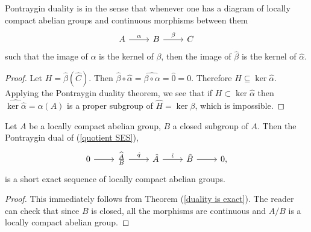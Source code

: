 \begin{theorem}\label{duality is exact}
Pontraygin duality is  in the sense that whenever one has a diagram of locally compact abelian groups and continuous morphisms between them
\[\begin{tikzcd}
A \arrow[r,"\alpha"] & B \arrow[r, "\beta"] & C
\end{tikzcd}
\]
such that the image of $\alpha$ is the kernel of $\beta$, then the image of $\hat{\beta}$ is the kernel of $\hat{\alpha}$.
\end{theorem}
\begin{proof}
Let $H = \hat{\beta}(\hat{C})$. Then $\hat{\beta} \circ \hat{\alpha} = \widehat{\beta \circ \alpha} = \hat 0 = 0$. Therefore $H \subseteq \ker \hat{\alpha}$.
Applying the Pontraygin duality theorem, we see that if $H \subset \ker \hat{\alpha}$ then $\widehat{\ker \hat{\alpha}} = \alpha(A)$ is a proper subgroup of $\hat{H} = \ker \beta$, which is impossible.
\end{proof}

\begin{corollary}\label{duality is exact 2}
Let $A$ be a locally compact abelian group, $B$ a closed subgroup of $A$.
Then the Pontraygin dual of (\ref{quotient SES}),
\[
\begin{tikzcd}
0 \arrow[r] & \widehat{\frac{A}{B}} \arrow[r,"\hat{q}"] & \hat{A} \arrow[r,"\hat{\iota}"] & \hat{B} \arrow[r] & 0,
\end{tikzcd}
\]
is a short exact sequence of locally compact abelian groups.
\end{corollary}
\begin{proof}
This immediately follows from Theorem (\ref{duality is exact}).
The reader can check that since $B$ is closed, all the morphisms are continuous and $A/B$ is a locally compact abelian group.
\end{proof}

